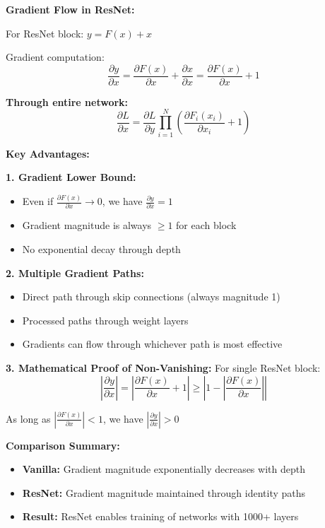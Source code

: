 \documentclass[12pt]{article}
\begin{document}
\begin{enumerate}[(a)]
{    \textbf{Gradient Flow in ResNet:}
    
    For ResNet block: $y = F(x) + x$
    
    Gradient computation:
    $$\frac{\partial y}{\partial x} = \frac{\partial F(x)}{\partial x} + \frac{\partial x}{\partial x} = \frac{\partial F(x)}{\partial x} + 1$$
    
    \textbf{Through entire network:}
    $$\frac{\partial L}{\partial x} = \frac{\partial L}{\partial y} \prod_{i=1}^{N} \left( \frac{\partial F_i(x_i)}{\partial x_i} + 1 \right)$$
    
    \textbf{Key Advantages:}
    
    \textbf{1. Gradient Lower Bound:}
    \begin{itemize}
        \item Even if $\frac{\partial F(x)}{\partial x} \to 0$, we have $\frac{\partial y}{\partial x} = 1$
        \item Gradient magnitude is always $\geq 1$ for each block
        \item No exponential decay through depth
    \end{itemize}
    
    \textbf{2. Multiple Gradient Paths:}
    \begin{itemize}
        \item Direct path through skip connections (always magnitude 1)
        \item Processed paths through weight layers
        \item Gradients can flow through whichever path is most effective
    \end{itemize}
    
    \textbf{3. Mathematical Proof of Non-Vanishing:}
    For single ResNet block:
    $$\left| \frac{\partial y}{\partial x} \right| = \left| \frac{\partial F(x)}{\partial x} + 1 \right| \geq \left| 1 - \left| \frac{\partial F(x)}{\partial x} \right| \right|$$
    
    As long as $\left| \frac{\partial F(x)}{\partial x} \right| < 1$, we have $\left| \frac{\partial y}{\partial x} \right| > 0$
    
    \textbf{Comparison Summary:}
    \begin{itemize}
        \item \textbf{Vanilla:} Gradient magnitude exponentially decreases with depth
        \item \textbf{ResNet:} Gradient magnitude maintained through identity paths
        \item \textbf{Result:} ResNet enables training of networks with 1000+ layers
    \end{itemize}
    }
\end{enumerate}
\end{document}
